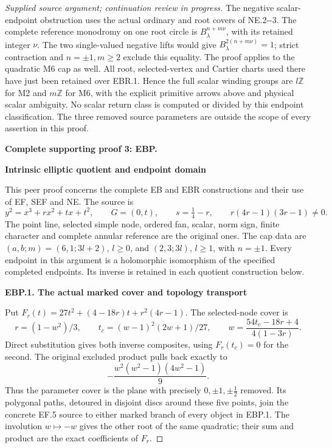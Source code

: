 \begin{proof}[Supplied source argument; continuation review in progress]
The negative scalar-endpoint obstruction uses the actual
ordinary and root covers of NE.2-\/-3. The complete reference
monodromy on one root circle is \(B_\lambda^{n+m\nu}\),
with its retained integer \(\nu\). The two single-valued
negative lifts would give
\(B_\lambda^{2(n+m\nu)}=1\); strict contraction and
\(n=\pm1,m\ge2\) exclude this equality. The proof applies
to the quadratic M6 cap as well. All root, selected-vertex
and Cartier charts used there have just been retained over
EBR.1. Hence the full scalar winding groups are
\(l\mathbb Z\) for M2 and \(m\mathbb Z\) for M6, with the
explicit primitive arrows above and physical scalar ambiguity.
No scalar return class is computed or divided by this endpoint
classification. The three removed source parameters are outside
the scope of every assertion in this proof.



\par\bigskip\noindent\textbf{Complete supporting proof 3: EBP.}\par


\par

\medskip\noindent\textbf{Intrinsic elliptic quotient and endpoint domain}

\par\nobreak

This peer proof concerns the complete EB and EBR constructions and their
use of EF, SEF and NE. The source is
\[
 y^2=x^3+rx^2+tx+t^2,\qquad G=(0,t),\qquad
 s=\tfrac14-r,\qquad r(4r-1)(3r-1)\ne0.
 \tag{EBP.1}
\]
The point line, selected simple node, ordered fan, scalar, norm sign,
finite character and complete annular reference are the original ones.
The cap data are \((a,b;m)=(6,1;3l+2)\), \(l\ge0\), and
\((2,3;3l)\), \(l\ge1\), with \(n=\pm1\). Every endpoint in
this argument is a holomorphic isomorphism of the specified completed
endpoints. Its inverse is retained in each quotient construction below.

\par

\medskip\noindent\textbf{EBP.1. The actual marked cover and topology transport}

\par\nobreak

Put \(F_r(t)=27t^2+(4-18r)t+r^2(4r-1)\). The selected-node cover is
\[
 r=(1-w^2)/3,\qquad t_c=(w-1)^2(2w+1)/27,
 \qquad
 w=\frac{54t_c-18r+4}{4(1-3r)}.
 \tag{EBP.2}
\]
Direct substitution gives both inverse composites, using \(F_r(t_c)=0\)
for the second. The original excluded product pulls back exactly to
\[
 -\frac{w^2(w^2-1)(4w^2-1)}9.
 \tag{EBP.3}
\]
Thus the parameter cover is the plane with precisely
\(0,\pm1,\pm\tfrac12\) removed. Its polygonal paths, detoured in
disjoint discs around these five points, join the concrete EF.5 source
to either marked branch of every object in EBP.1. The involution
\(w\mapsto-w\) gives the other root of the same quadratic; their sum
and product are the exact coefficients of \(F_r\).


\end{proof}
